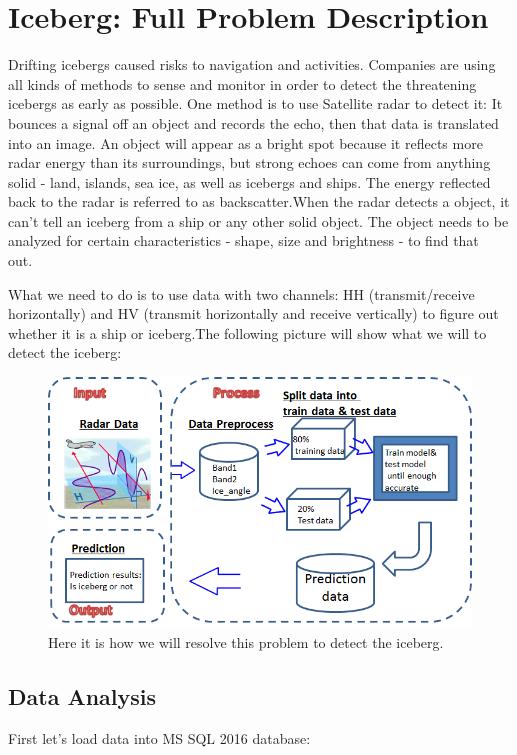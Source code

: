 \documentclass[fleqn,10pt]{SelfArx} %
\begin{document}
\section{Iceberg: Full Problem Description}

Drifting icebergs caused risks to navigation and activities. Companies are using all kinds of methods to sense and monitor in order to detect the threatening icebergs as early as possible. One method is to use Satellite radar to detect it:  It bounces a signal off an object and records the echo, then that data is translated into an image. An object will appear as a bright spot because it reflects more radar energy than its surroundings, but strong echoes can come from anything solid - land, islands, sea ice, as well as icebergs and ships. The energy reflected back to the radar is referred to as backscatter.When the radar detects a object, it can't tell an iceberg from a ship or any other solid object. The object needs to be analyzed for certain characteristics - shape, size and brightness - to find that out.\

What we need to do is to use data with two channels: HH (transmit/receive horizontally) and HV (transmit horizontally and receive vertically) to figure out whether it is a ship or iceberg.The following picture will show what we will to detect the iceberg:
\begin{figure}[ht]\centering
\includegraphics[width=\linewidth]{p2inputoutput}
\caption{Here it is how we will resolve this problem to detect the iceberg.}
\label{fig:p2inputoutput}
\end{figure}


\subsection{Data Analysis}
First let's load data into MS SQL 2016 database:
\end{document}
